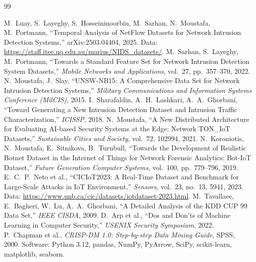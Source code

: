 \documentclass[12pt,a4paper]{article}
\begin{document}
\begin{thebibliography}{99}\small
{}
 M.~Luay, S.~Layeghy, S.~Hosseininoorbin, M.~Sarhan, N.~Moustafa, M.~Portmann, ``Temporal Analysis
of NetFlow Datasets for Network Intrusion Detection Systems,'' arXiv:2503.04404, 2025. Data:
\url{https://staff.itee.uq.edu.au/marius/NIDS_datasets/}.
 M.~Sarhan, S.~Layeghy, M.~Portmann, ``Towards a Standard Feature Set for Network Intrusion
Detection System Datasets,'' \emph{Mobile Networks and Applications}, vol.~27, pp.~357--370, 2022.
 N.~Moustafa, J.~Slay, ``UNSW-NB15: A Comprehensive Data Set for Network Intrusion Detection Systems,''
\emph{Military Communications and Information Systems Conference (MilCIS)}, 2015.
 I.~Sharafaldin, A.~H.~Lashkari, A.~A.~Ghorbani, ``Toward Generating a New Intrusion Detection Dataset
and Intrusion Traffic Characterization,'' \emph{ICISSP}, 2018.
 N.~Moustafa, ``A New Distributed Architecture for Evaluating AI-based Security Systems at the Edge:
Network TON\_IoT Datasets,'' \emph{Sustainable Cities and Society}, vol.~72, 102994, 2021.
 N.~Koroniotis, N.~Moustafa, E.~Sitnikova, B.~Turnbull, ``Towards the Development of Realistic Botnet
Dataset in the Internet of Things for Network Forensic Analytics: Bot-IoT Dataset,'' \emph{Future Generation Computer
Systems}, vol.~100, pp.~779--796, 2019.
 E.~C.~P.~Neto et al., ``CICIoT2023: A Real-Time Dataset and Benchmark for Large-Scale Attacks in
IoT Environment,'' \emph{Sensors}, vol.~23, no.~13, 5941, 2023. Data:
\url{https://www.unb.ca/cic/datasets/iotdataset-2023.html}.
 M.~Tavallaee, E.~Bagheri, W.~Lu, A.~A.~Ghorbani, ``A Detailed Analysis of the KDD CUP 99 Data Set,''
\emph{IEEE CISDA}, 2009.
 D.~Arp et al., ``Dos and Don'ts of Machine Learning in Computer Security,'' \emph{USENIX Security
Symposium}, 2022.
 P.~Chapman et al., \emph{CRISP-DM 1.0: Step-by-step Data Mining Guide}, SPSS, 2000.
 Software: Python 3.12, pandas, NumPy, PyArrow, SciPy, scikit-learn, matplotlib, seaborn.
\end{thebibliography}

\newpage
\appendix
\end{document}
